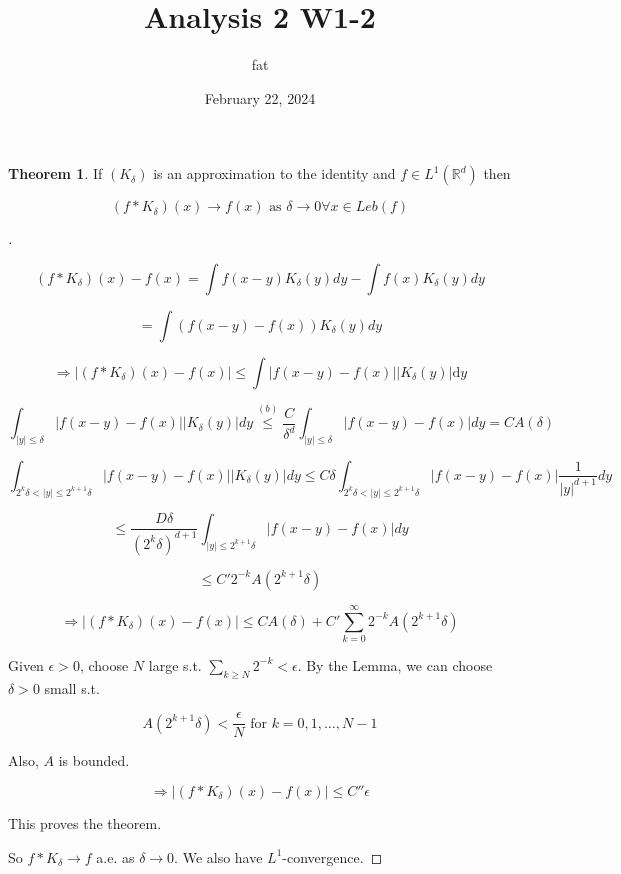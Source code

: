 \documentclass{article}
\title{Analysis 2 W1-2}
\author{fat}
\date{February 22, 2024}
\theoremstyle{definition}
\newtheorem{thm}{Theorem}
\newenvironment{proofs}[1][\proofname]{%
  \begin{proof}[#1]$ $\par\nobreak\ignorespaces
}{%
  \end{proof}
}
\begin{document}
\maketitle
\thispagestyle{fancy}
\renewcommand{\footrulewidth}{0.4pt}
\cfoot{\thepage}
\renewcommand{\headrulewidth}{0.4pt}

\begin{thm}
  If $(K_\delta)$ is an approximation to the identity and $f \in L^1(\mathbb{R}^d)$ then

  $$(f * K_\delta) (x) \rightarrow f(x) \text{ as } \delta \rightarrow 0 \forall x \in Leb(f)$$
\end{thm}

\begin{proofs}
  $$(f * K_\delta)(x) - f(x) = \int f(x - y) K_\delta (y) dy - \int f(x) K_\delta (y) dy$$

  $$ = \int (f(x - y) - f(x)) K_\delta(y) dy$$

  $$\Rightarrow |(f* K_\delta)(x) - f(x)| \leq \int |f(x - y) - f(x)| |K_\delta(y)| \mathrm{d}y$$

  $$\int_{|y| \leq \delta} |f(x - y) - f(x)| |K_\delta(y)| dy \stackrel{(b)}{\leq} \frac{C}{\delta^d} \int_{|y| \leq \delta} |f(x - y) - f(x)| dy = CA(\delta) $$

  $$\int_{2^k \delta < |y| \leq 2^{k +1 } \delta} |f(x - y) - f(x)| |K_\delta (y)| dy \leq C \delta \int_{2^k  \delta < |y| \leq 2^{k + 1} \delta} |f(x - y) - f(x)| \frac{1}{|y|^{d+1}} dy$$

  $$\leq \frac{D \delta}{(2^k \delta)^{d + 1}} \int_{|y| \leq 2^{k+1} \delta} |f(x - y) - f(x)| dy$$

  $$\leq C' 2^{-k} A(2^{k + 1} \delta)$$

  $$\Rightarrow |(f*K_\delta)(x) - f(x)| \leq CA(\delta) + C' \sum_{k = 0}^\infty 2^{-k} A(2^{k+1} \delta)$$

  Given $\epsilon > 0$, choose $N$ large s.t. $\sum_{k \geq N} 2^{-k} < \epsilon$. By the Lemma, we can choose $\delta > 0$ small s.t. 

  $$A(2^{k +1} \delta) < \frac{\epsilon}{N} \text{ for } k= 0, 1, \hdots, N - 1$$

  Also, $A$ is bounded.

  $$\Rightarrow |(f*K_\delta)(x) - f(x)| \leq C'' \epsilon$$

  This proves the theorem. 

  \par So $f * K_\delta \rightarrow f$ a.e. as $\delta \rightarrow 0$. We also have $L^1$-convergence.


\end{proofs}
\end{document}
